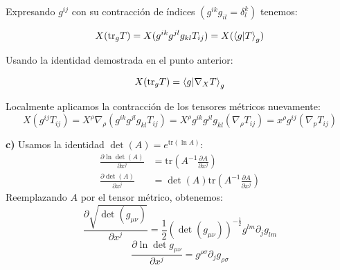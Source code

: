 \documentclass{article}
\begin{document}
Expresando $g^{ij}$ con su contracción de índices $(g^{ik} g_{il} = \delta_{l}^{k})$ tenemos:

\[
  X (\text{tr}_{g} T) = X (g^{ik} g^{jl}g_{kl}T_{ij}) = X(\bra{g}\ket{T}_g)
\]

Usando la identidad demostrada en el punto anterior:

\[
  X (\text{tr}_{g} T) = \bra{g}\ket{\nabla_X T}_g
\]

Localmente aplicamos la contracción de los tensores métricos nuevamente:
\[
  X (g^{ij} T_{ij}) = X^{\rho} \nabla_\rho (g^{ik} g^{jl} g_{kl} T_{ij}) = X^{\rho} g^{ik} g^{jl} g_{kl} (\nabla_\rho T_{ij}) = x^{\rho}g^{ij} (\nabla_p T_{ij})
\]




\textbf{c) } Usamos la identidad $\det(A) = e^{\text{tr} (\ln A)}$:
\begin{align}
\frac{\partial \ln \det (A)}{\partial x^j} &= \text{tr} (A^{-1} \frac{\partial A}{\partial x^j}) \\
\frac{\partial \det (A)}{\partial x^j} &= \det (A) \text{tr} (A^{-1} \frac{\partial A}{\partial x^j})
\end{align}
Reemplazando $A$ por el tensor métrico, obtenemos:
\[
\frac{\partial \sqrt{\det (g_{\mu\nu})}}{\partial x^j} = \frac{1}{2} (\det (g_{\mu\nu}))^{-\frac{1}{2}} g^{lm} \partial_j g_{lm}
\]
\[
\frac{\partial \ln \det g_{\mu\nu}}{\partial x^j} = g^{\rho\sigma} \partial_j g_{\rho\sigma}
\]
\end{document}
